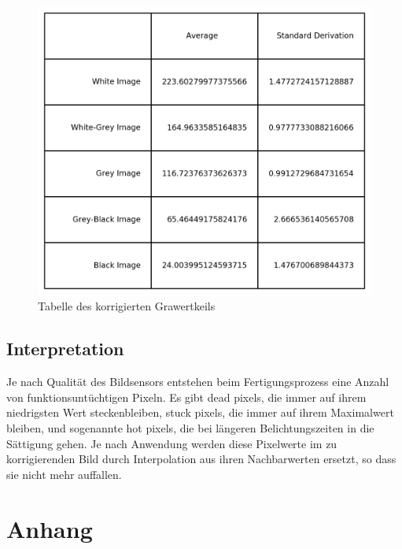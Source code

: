 \documentclass[12pt, oneside, a4paper, \docLanguage]{report}
\begin{document}
\begin{figure}[H]
\centering
\includegraphics[scale=1]{../tableCorrected.png}
\caption{Tabelle des korrigierten Grawertkeils}
\end{figure}

\section{Interpretation}
\label{chap:VERSUCH_4_INTERPRETATION}
Je nach Qualität des Bildsensors entstehen beim Fertigungsprozess eine Anzahl von funktionsuntüchtigen Pixeln. Es gibt dead pixels, die immer auf ihrem niedrigsten Wert steckenbleiben,
stuck pixels, die immer auf ihrem Maximalwert bleiben, und sogenannte hot pixels, die bei längeren Belichtungszeiten in die Sättigung gehen.  Je nach Anwendung werden diese Pixelwerte im zu korrigierenden Bild durch Interpolation aus ihren Nachbarwerten ersetzt, so dass sie nicht mehr auffallen.\newline

%
%
\renewcommand\thesection{A.\arabic{section}}
\renewcommand\thesubsection{\thesection.\arabic{subsection}}

\chapter*{Anhang}
\label{chap:APPENDIX}
\addtocounter{chapter}{1}
\setcounter{section}{0}
\end{document}

